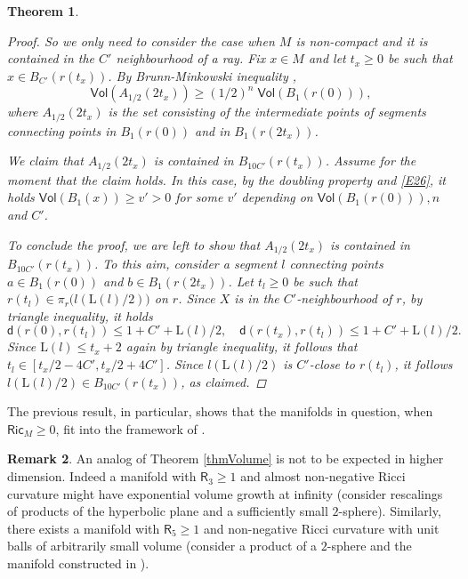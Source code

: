\documentclass[10pt]{article}
\newtheorem{thm}{Theorem}[section]
\theoremstyle{definition}
\newtheorem{remark}[thm]{Remark}
\newcommand{\ssf}[1]{\mathsf{#1}}
\newcommand{\Ric}{\mathsf{Ric}}
\newcommand{\length}{\mathrm{L}}
\newcommand{\sd}{\mathsf{d}}
\newcommand{\R}{\mathsf{R}}
\begin{document}
\begin{thm}
\begin{proof}
    So we only need to consider the case when $M$ is non-compact and it is contained in the $C'$ neighbourhood of a ray.
    Fix $x\in M$ and let $t_x \geq 0$ be such that  $ x\in B_{C'}(r(t_x))$.
    By Brunn-Minkowski inequality \cite{S2}, 
    \begin{equation} \label{E26}
    \ssf{Vol}(A_{1/2}(2t_x)) \geq (1/2)^n \; \ssf{Vol}(B_1(r(0))),
    \end{equation}
    where $A_{1/2}(2t_x)$ is the set consisting of the intermediate points of segments connecting points in $B_1(r(0))$ and in $B_1(r(2t_x))$. 
    
    We claim that $A_{1/2}(2t_x)$ is contained in $B_{10C'}(r(t_x))$. Assume for the moment that the claim holds. In this case, by the doubling property and \eqref{E26}, it holds $\ssf{Vol}(B_1(x)) \geq v'>0$ for some $v'$ depending on $\ssf{Vol}(B_1(r(0))), n$ and $C'$. 

    To conclude the proof, we are left to show that $A_{1/2}(2t_x)$ is contained in $B_{10C'}(r(t_x))$.
    To this aim, consider a segment $l$ connecting points $a \in B_1(r(0))$ and $b \in B_1(r(2t_x))$. Let $t_l \geq 0$ be such that $r(t_l) \in \pi_r\big(l(\length(l)/2)\big)$ on $r$. Since $X$ is in the $C'$-neighbourhood of $r$, by triangle inequality, it holds
    \[
    \sd(r(0),r(t_l)) \leq 1+C'+\length(l)/2, \quad
    \sd(r(t_x),r(t_l)) \leq 1+C'+\length(l)/2.
    \]
    Since $\length(l) \leq t_x+2$ again by triangle inequality, it follows that $t_l \in [t_x/2-4C',t_x/2+4C']$. Since $l(\length(l)/2)$ is $C'$-close to $r(t_l)$, it follows $l(\length(l)/2) \in B_{10C'}(r(t_x))$, as claimed.
    \end{proof}
\end{thm}

The previous result, in particular, shows that the manifolds in question, when $\Ric_M \geq 0$, fit into the framework of \cite{ZhuLinear}.

\begin{remark} \label{R7}
        An analog of Theorem \ref{thmVolume} is not to be expected in higher dimension. Indeed a manifold with $\R_3 \geq 1$ and almost non-negative Ricci curvature might have exponential volume growth at infinity (consider rescalings of products of the hyperbolic plane and a sufficiently small $2$-sphere). Similarly, there exists a manifold with $\R_5 \geq 1$ and non-negative Ricci curvature with unit balls of arbitrarily small volume (consider a product of a $2$-sphere and the manifold constructed in \cite[Example $26$]{SormaniExample}).
    \end{remark}
\end{document}
